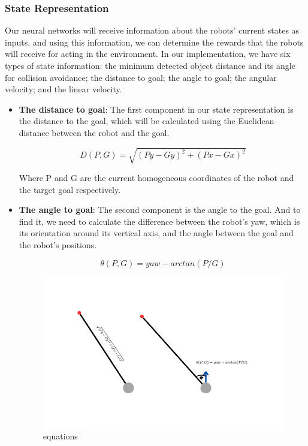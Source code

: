 \documentclass[12pt]{extarticle}
\begin{document}
\subsubsection{State Representation}
Our neural networks will receive information about the robots' current states as inputs, and using this information, we can determine the rewards that the robots will receive for acting in the environment.
In our implementation, we have six types of state information: the minimum detected object distance and its angle for collision avoidance; the distance to goal; the angle to goal; the angular velocity; and the linear velocity.



\begin{itemize}
\item \textbf{The distance to goal}: 
The first component in our state representation is the distance to the goal, which will be calculated using the Euclidean distance between the robot and the goal.

\[ D(P,G)=\sqrt{(Py-Gy)^2+(Px-Gx)^2}  \] 

Where P and G are the current homogeneous coordinates of the robot and the target goal respectively.

\item \textbf{The angle to goal}: 
The second component is the angle to the goal. And to find it, we need to calculate the difference between the robot's yaw, which is its orientation around its vertical axis, and the angle between the goal and the robot's positions.


\[ \theta(P,G)=yaw-arctan(P/G)  \] 

 \begin{figure}[h]  
\centering
\includegraphics[scale=0.8]{equations}
\caption[equations]{equations}
\end{figure}



\end{itemize}
\end{document}
